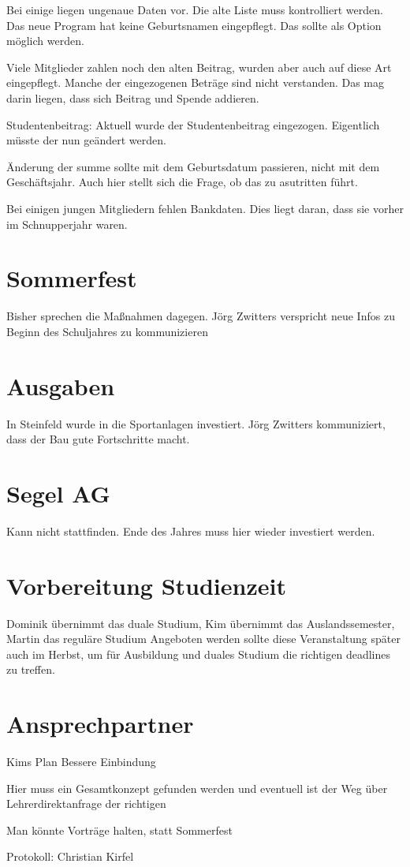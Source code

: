 \documentclass[a4paper, 11pt]{article}
\newcommand\signature[2]{%
\noindent\begin{minipage}{5cm}
    \noindent\vspace{3cm}\par
    \noindent\rule{5cm}{1pt}\par
    \noindent\textbf{#1}\par
    \noindent#2%
\end{minipage}}
\begin{document}
Bei einige liegen ungenaue Daten vor. Die alte Liste muss kontrolliert werden.
Das neue Program hat keine Geburtsnamen eingepflegt.
Das sollte als Option möglich werden.

Viele Mitglieder zahlen noch den alten Beitrag, wurden aber auch auf diese Art eingepflegt.
Manche der eingezogenen Beträge sind nicht verstanden. Das mag darin liegen, dass sich Beitrag und Spende addieren.

Studentenbeitrag:
Aktuell wurde der Studentenbeitrag eingezogen. Eigentlich müsste der nun geändert werden.

Änderung der summe sollte mit dem Geburtsdatum passieren, nicht mit dem Geschäftsjahr.
Auch hier stellt sich die Frage, ob das zu asutritten führt.

Bei einigen jungen Mitgliedern fehlen Bankdaten. Dies liegt daran, dass sie vorher im Schnupperjahr waren.

\section*{Sommerfest}

Bisher sprechen die Maßnahmen dagegen.
Jörg Zwitters verspricht neue Infos zu Beginn des Schuljahres zu kommunizieren

\section*{Ausgaben}

In Steinfeld wurde in die Sportanlagen investiert.
Jörg Zwitters kommuniziert, dass der Bau gute Fortschritte macht.

\section*{Segel AG}

Kann nicht stattfinden. Ende des Jahres muss hier wieder investiert werden.

\section*{Vorbereitung Studienzeit}

Dominik übernimmt das duale Studium, Kim übernimmt das Auslandssemester, Martin das reguläre Studium
Angeboten werden sollte diese Veranstaltung später auch im Herbst, um für Ausbildung und duales Studium die richtigen deadlines zu treffen.

\section*{Ansprechpartner}

Kims Plan
Bessere Einbindung

Hier muss ein Gesamtkonzept gefunden werden und eventuell ist der Weg über Lehrerdirektanfrage der richtigen

Man könnte Vorträge halten, statt Sommerfest



\newpage

Protokoll: Christian Kirfel


\end{document}
